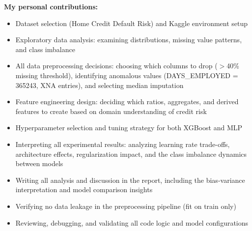 \documentclass[11pt, letterpaper]{article}
\begin{document}
\textbf{My personal contributions:}
\begin{itemize}[nosep]
    \item Dataset selection (Home Credit Default Risk) and Kaggle environment setup
    \item Exploratory data analysis: examining distributions, missing value patterns, and class imbalance
    \item All data preprocessing decisions: choosing which columns to drop ($>$40\% missing threshold), identifying anomalous values (DAYS\_EMPLOYED = 365243, XNA entries), and selecting median imputation
    \item Feature engineering design: deciding which ratios, aggregates, and derived features to create based on domain understanding of credit risk
    \item Hyperparameter selection and tuning strategy for both XGBoost and MLP
    \item Interpreting all experimental results: analyzing learning rate trade-offs, architecture effects, regularization impact, and the class imbalance dynamics between models
    \item Writing all analysis and discussion in the report, including the bias-variance interpretation and model comparison insights
    \item Verifying no data leakage in the preprocessing pipeline (fit on train only)
    \item Reviewing, debugging, and validating all code logic and model configurations
\end{itemize}
\end{document}
